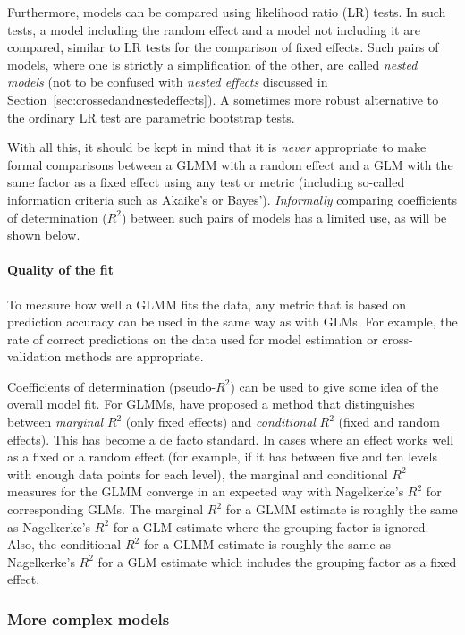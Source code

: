 Furthermore, models can be compared using likelihood ratio (LR) tests.
In such tests, a model including the random effect and a model not including it are compared, similar to LR tests for the comparison of fixed effects.
Such pairs of models, where one is strictly a simplification of the other, are called \textit{nested models} (not to be confused with \textit{nested effects} discussed in Section~\ref{sec:crossedandnestedeffects}).
A sometimes more robust alternative to the ordinary LR test are parametric bootstrap tests. 

With all this, it should be kept in mind that it is \textit{never} appropriate to make formal comparisons between a GLMM with a random effect and a GLM with the same factor as a fixed effect using any test or metric (including so-called information criteria such as Akaike's or Bayes').
\textit{Informally} comparing coefficients of determination ($R^2$) between such pairs of models has a limited use, as will be shown below.

\paragraph{Quality of the fit}

To measure how well a GLMM fits the data, any metric that is based on prediction accuracy can be used in the same way as with GLMs.
For example, the rate of correct predictions on the data used for model estimation or cross-validation methods are appropriate.

Coefficients of determination (pseudo-$R^2$) can be used to give some idea of the overall model fit.
For GLMMs, \citet{NakagawaSchielzeth2013} have proposed a method that distinguishes between \textit{marginal} $R^2$ (only fixed effects) and \textit{conditional} $R^2$ (fixed and random effects).
This has become a de facto standard.
In cases where an effect works well as a fixed or a random effect (for example, if it has between five and ten levels with enough data points for each level), the marginal and conditional $R^2$ measures for the GLMM converge in an expected way with Nagelkerke's $R^2$ for corresponding GLMs.
The marginal $R^2$ for a GLMM estimate is roughly the same as Nagelkerke's $R^2$ for a GLM estimate where the grouping factor is ignored.
Also, the conditional $R^2$ for a GLMM estimate is roughly the same as Nagelkerke's $R^2$ for a GLM estimate which includes the grouping factor as a fixed effect.


\subsubsection{More complex models}
\label{sec:morecomplexmodels}

